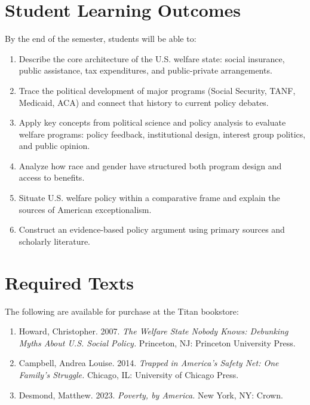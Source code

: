\documentclass[12pt]{article}
\begin{document}
\section*{Student Learning Outcomes}

{\setlength{\parindent}{0pt}\setlength{\parskip}{0.6\baselineskip}%
By the end of the semester, students will be able to:

\begin{enumerate}
    \item Describe the core architecture of the U.S. welfare state: social insurance, public assistance, tax expenditures, and public-private arrangements.
    \item Trace the political development of major programs (Social Security, TANF, Medicaid, ACA) and connect that history to current policy debates.
    \item Apply key concepts from political science and policy analysis to evaluate welfare programs: policy feedback, institutional design, interest group politics, and public opinion.
    \item Analyze how race and gender have structured both program design and access to benefits.
    \item Situate U.S. welfare policy within a comparative frame and explain the sources of American exceptionalism.
    \item Construct an evidence-based policy argument using primary sources and scholarly literature.
\end{enumerate}
}

\section*{Required Texts}

The following are available for purchase at the Titan bookstore:

\begin{enumerate}
    \item Howard, Christopher. 2007. \emph{The Welfare State Nobody Knows: Debunking Myths About U.S. Social Policy.} Princeton, NJ: Princeton University Press.
    \item Campbell, Andrea Louise. 2014. \emph{Trapped in America's Safety Net: One Family's Struggle.} Chicago, IL: University of Chicago Press.
    \item Desmond, Matthew. 2023. \emph{Poverty, by America.} New York, NY: Crown.
\end{enumerate}
\end{document}
